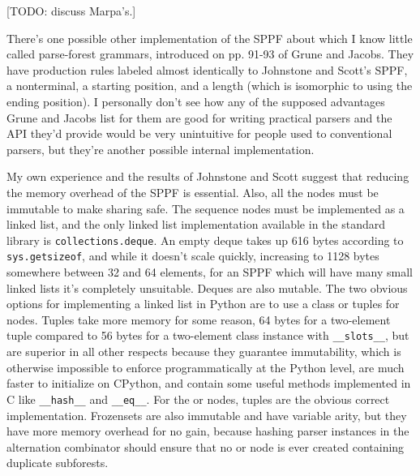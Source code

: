 \documentclass[12pt]{article}
\begin{document}
[TODO: discuss Marpa's.]

There's one possible other implementation of the SPPF about which I
know little called parse-forest grammars, introduced on pp. 91-93 of
Grune and Jacobs.  They have production rules labeled almost
identically to Johnstone and Scott's SPPF, a nonterminal, a starting
position, and a length (which is isomorphic to using the ending
position).  I personally don't see how any of the supposed advantages
Grune and Jacobs list for them are good for writing practical parsers
and the API they'd provide would be very unintuitive for people used
to conventional parsers, but they're another possible internal
implementation.

My own experience and the results of Johnstone and Scott suggest that
reducing the memory overhead of the SPPF is essential.  Also, all the
nodes must be immutable to make sharing safe.  The sequence nodes must
be implemented as a linked list, and the only linked list
implementation available in the standard library is
\texttt{collections.deque}.  An empty deque takes up 616 bytes
according to \texttt{sys.getsizeof}, and while it doesn't scale
quickly, increasing to 1128 bytes somewhere between 32 and 64
elements, for an SPPF which will have many small linked lists it's
completely unsuitable.  Deques are also mutable.  The two obvious
options for implementing a linked list in Python are to use a class or
tuples for nodes.  Tuples take more memory for some reason, 64 bytes
for a two-element tuple compared to 56 bytes for a two-element class
instance with \texttt{\_\_slots\_\_}, but are superior in all other
respects because they guarantee immutability, which is otherwise
impossible to enforce programmatically at the Python level, are much
faster to initialize on CPython, and contain some useful methods
implemented in C like \texttt{\_\_hash\_\_} and \texttt{\_\_eq\_\_}.  For the
or nodes, tuples are the obvious correct implementation.  Frozensets
are also immutable and have variable arity, but they have more memory
overhead for no gain, because hashing parser instances in the
alternation combinator should ensure that no or node is ever created
containing duplicate subforests.
\end{document}
